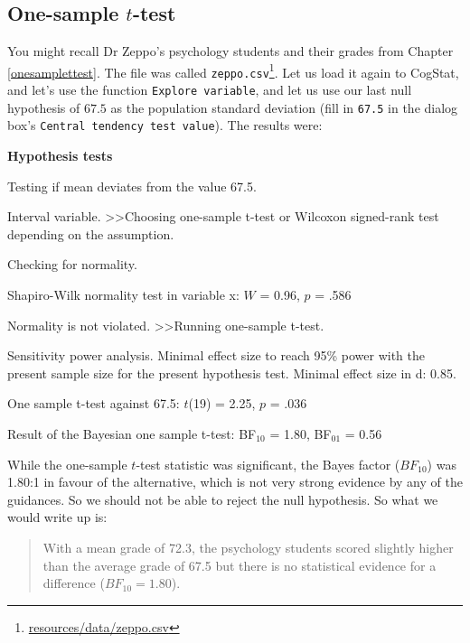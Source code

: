 \documentclass[
  11pt,
  a4paper,
  twoside,symmetric,openright]{book}
\theoremstyle{break}
\theoremstyle{break}
\DeclareRobustCommand{\href}[2]{#2\footnote{\url{#1}}}
\begin{document}
\subsection{\texorpdfstring{One-sample \(t\)-test}{One-sample t-test}}\label{one-sample-t-test}

You might recall Dr Zeppo's psychology students and their grades from Chapter \ref{onesamplettest}. The file was called \href{resources/data/zeppo.csv}{\texttt{zeppo.csv}}. Let us load it again to CogStat, and let's use the function \texttt{Explore\ variable}, and let us use our last null hypothesis of \(67.5\) as the population standard deviation (fill in \texttt{67.5} in the dialog box's \texttt{Central\ tendency\ test\ value}). The results were:

\begin{tcolorbox}[colback=white,
  colframe=lightgray,
  coltext=black,
  boxsep=4pt,
  boxrule=0.3pt,
  arc=0pt]
  {   \sffamily
      \color{CSblue}\textbf{Hypothesis tests}
      
      \color{CSgreen}Testing if mean deviates from the value 67.5.
      
      Interval variable. \textgreater\textgreater  Choosing one-sample t-test or Wilcoxon signed-rank test depending on the assumption.

      Checking for normality.

      \color{black}
      Shapiro-Wilk normality test in variable x: $W$ = 0.96, $p$ = .586

      \color{CSgreen}
      Normality is not violated. \textgreater\textgreater Running one-sample t-test.

      \color{black}
      Sensitivity power analysis. Minimal effect size to reach 95\% power with the present sample size for the present hypothesis test. Minimal effect size in d: 0.85.
      
      One sample t-test against 67.5: $t$(19) = 2.25, $p$ = .036

      Result of the Bayesian one sample t-test: BF$_{10}$ = 1.80, BF$_{01}$ = 0.56
      \normalfont
  }
\end{tcolorbox}

While the one-sample \(t\)-test statistic was significant, the Bayes factor (\(BF_10\)) was 1.80:1 in favour of the alternative, which is not very strong evidence by any of the guidances. So we should not be able to reject the null hypothesis. So what we would write up is:

\begin{quote}
With a mean grade of 72.3, the psychology students scored slightly higher than the average grade of 67.5 but there is no statistical evidence for a difference (\(BF_{10} = 1.80\)).
\end{quote}
\end{document}
